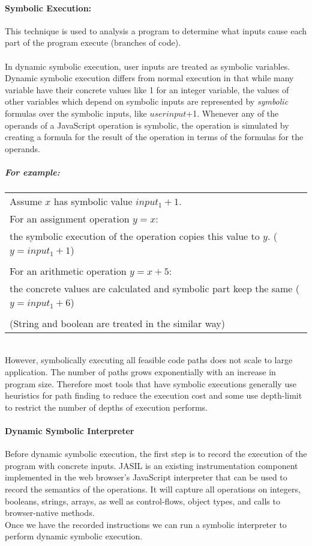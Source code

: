 \paragraph{Symbolic Execution:} This technique is used to analysis a program to determine what inputs cause each part of the program execute (branches of code).\\ \\
In dynamic symbolic execution, user inputs are treated as symbolic variables. Dynamic symbolic execution differs from normal execution in that while many variable have their concrete values like 1 for an integer variable, the values of other variables which depend on symbolic inputs are represented by \textit{symbolic} formulas over the symbolic inputs, like $userinput$+1. Whenever any of the operands of a JavaScript operation is symbolic, the operation is simulated by creating a formula for the result of the operation in terms of the formulas for the operands.  
\subparagraph{For example:}
\begin{center}
\begin{tabular}{ |p{15cm}| } 
 \hline
Assume $x$ has symbolic value $input_{1}+1$. \\
For an assignment operation $y = x$:\\
\qquad the symbolic execution of the operation copies this value to $y$. ($y=input_{1}+1$)\\ \\
For an arithmetic operation $y = x + 5$:\\
\qquad the concrete values are calculated and symbolic part keep the same ($y=input_{1}+6$) \\ \\
(String and boolean are treated in the similar way) \\
\hline
\end{tabular}
\end{center}
\phantom \\
However, symbolically executing all feasible code paths does not scale to large application. The number of paths grows exponentially with an increase in program size. Therefore most tools that have symbolic executions generally use heuristics for path finding to reduce the execution cost and some use depth-limit to restrict the number of depths of execution performs.
\paragraph{Dynamic Symbolic Interpreter}
Before dynamic symbolic execution, the first step is to record the execution of the program with concrete inputs. JASIL\cite{JASIL} is an existing instrumentation component implemented in the web browser's JavaScript interpreter that can be used to record the semantics of the operations. It will capture all operations on integers, booleans, strings, arrays, as well as control-flows, object types, and calls to browser-native methods. \\
Once we have the recorded instructions we can run a symbolic interpreter to perform dynamic symbolic execution.
\newpage
